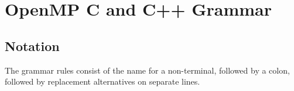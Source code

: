 %
%
%
%
%
%
%
%
%
%


\newcommand{\I}{\hspace{2em}}                  %
\newcommand{\G}{\rmfamily\mdseries\slshape\small}    %
\newcommand{\C}{\ttfamily\bfseries\upshape\small}    %



\chapter{OpenMP C and C++ Grammar}
\label{chap:OpenMP C and C++ Grammar}
\section{Notation}
\label{sec:Notation}
The grammar rules consist of the name for a non-terminal, followed by a colon, 
followed by replacement alternatives on separate lines.

